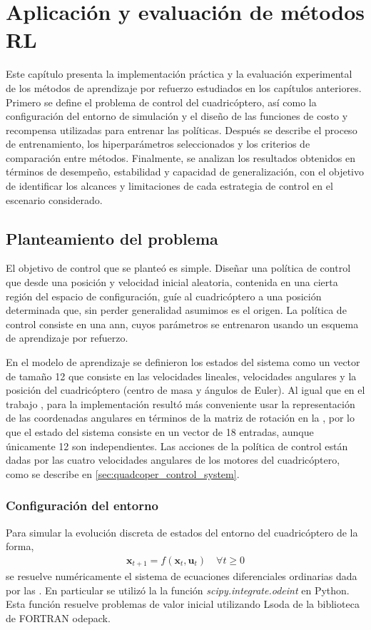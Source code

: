 \chapter{Aplicación y evaluación de métodos RL}
\label{chapter:experimentacion}
Este capítulo presenta la implementación práctica y la evaluación experimental de los métodos de aprendizaje por refuerzo estudiados en los capítulos anteriores. Primero se define el problema de control del cuadricóptero, así como la configuración del entorno de simulación y el diseño de las funciones de costo y recompensa utilizadas para entrenar las políticas. Después se describe el proceso de entrenamiento, los hiperparámetros seleccionados y los criterios de comparación entre métodos. Finalmente, se analizan los resultados obtenidos en términos de desempeño, estabilidad y capacidad de generalización, con el objetivo de identificar los alcances y limitaciones de cada estrategia de control en el escenario considerado.

\section{Planteamiento del problema}

El objetivo de control que se planteó es simple. Diseñar una política de control que desde una posición  y velocidad inicial aleatoria, contenida en una cierta región del espacio de configuración, guíe al cuadricóptero a una posición determinada que, sin perder generalidad asumimos es el origen. La política de control consiste en una \acrshort{ann}, cuyos parámetros se entrenaron usando un esquema de aprendizaje por refuerzo. 

En el modelo de aprendizaje se definieron los estados del sistema como un vector de tamaño 12 que consiste en las velocidades lineales, velocidades angulares y la posición del cuadricóptero (centro de masa y ángulos de Euler). Al igual que en el trabajo \cite{hwangbo2017control}, para la implementación resultó más conveniente usar la representación de las coordenadas angulares en términos de la matriz de rotación en la , por lo que el estado del sistema consiste en un vector de 18 entradas, aunque únicamente 12 son independientes.  
Las acciones de la política de control están dadas por las cuatro velocidades angulares de los motores del cuadricóptero, como se describe en  \ref{sec:quadcoper_control_system}.
\subsection{Configuración del entorno}
Para simular la evolución discreta de estados del entorno del cuadricóptero de la forma,
\begin{align}
    \mathbf{x}_{t+1}=f(\mathbf{x}_t, \mathbf{u}_t) \quad \forall t\geq0
    \label{eq:discrete_f}
    \end{align}
se resuelve numéricamente el sistema de ecuaciones diferenciales ordinarias dada por las . En particular se utilizó la la función \textit{scipy.integrate.odeint} en Python. Esta función resuelve problemas de valor inicial utilizando Lsoda de la biblioteca de FORTRAN odepack. 

